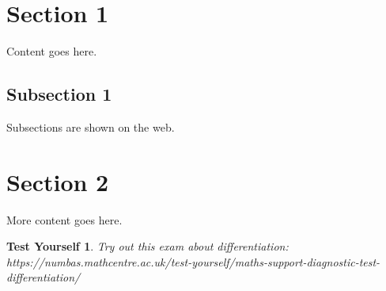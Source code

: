 \documentclass[a4paper]{article}
\newtheorem{nmbs_int}{Test Yourself}[section]
\newenvironment{numbas}[1][Visit the URL below to try a numbas exam:]{\begin{nmbs_int}\textrm{#1}\\}{\end{nmbs_int}}
\begin{document}
\section{Section 1}
Content goes here.
\subsection{Subsection 1}
Subsections are shown on the web.
\section{Section 2}
More content goes here.

\begin{numbas}[Try out this exam about differentiation:]
https://numbas.mathcentre.ac.uk/test-yourself/maths-support-diagnostic-test-differentiation/
\end{numbas}
\end{document}
